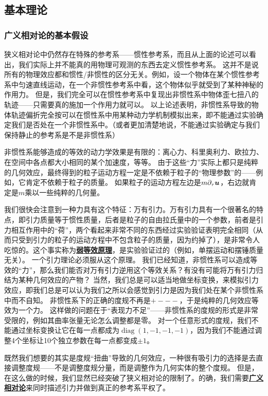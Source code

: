 \documentclass[hyperref, UTF8, a4paper]{ctexart}
\DeclareMathOperator{\diag}{diag}
\newcommand*{\concept}[1]{\underline{\textbf{#1}}}
\begin{document}
\subsection{基本理论}

\subsubsection{广义相对论的基本假设}

狭义相对论中仍然存在特殊的参考系——惯性参考系，而且从上面的论述可以看出，我们实际上并不能真的用物理可观测的东西去定义惯性参考系。
这并不是说所有的物理效应都和惯性/非惯性的区分无关。例如，设一个物体在某个惯性参考系中匀速直线运动，在一个非惯性参考系中看，这个物体似乎就受到了某种神秘的作用力。
但是，我们完全可以在惯性参考系中复现出非惯性系中物体歪七扭八的轨迹——只需要真的施加一个作用力就可以。
以上论述表明，非惯性系导致的物体轨迹偏折完全按可以在惯性系中用某种动力学机制模拟出来，即不能通过实验确定我们是否处在一个非惯性系中。（或者更加清楚地说，不能通过实验确定与我们保持静止的参考系是不是非惯性系）

非惯性系能够造成的等效的动力学效果是有限的：离心力、科里奥利力、欧拉力、在空间中各点都大小相同的某个加速度，等等。
由于这些“力”实际上都只是纯粹的几何效应，最终得到的粒子运动方程一定是不依赖于粒子的“物理参数”的——例如，它肯定不依赖于粒子的质量。
如果粒子的运动方程左边是$m \partial_\tau \vb*{u}$，右边就肯定是$m$乘以一些纯粹的几何量。

我们很快会注意到一种力具有这个特征：万有引力。万有引力具有一个很著名的特点，即引力质量等于惯性质量，后者是粒子的自由拉氏量中的一个参数，前者是引力相互作用中的“荷”，两个看起来非常不同的东西经过实验验证表明完全相同（从而只受到引力的粒子的运动方程中不包含粒子的质量，因为约掉了），是非常令人吃惊的。这个事实称为\concept{弱等效原理}，是实验验证过的（例如，单摆运动和摆锤质量无关）。
一个引力理论必须服从这个原理。
我们已经知道，非惯性系可以造成等效的“力”，那么我们能否对万有引力逆用这个等效关系？有没有可能将万有引力归结为某种几何效应的产物？
当然，我们总是可以适当地做坐标变换，来模拟引力效应，即我们总是可以认为我们之所以会感觉到引力是因为我们处在某个非惯性系中而不自知。
非惯性系下的正确的度规不再是$+---$，于是纯粹的几何效应等效为一个力。
这样做的问题在于“表现力不足”——非惯性系的度规的形式是非常受限的，例如其曲率张量无论怎么调整都是零。
对一个任意形式的度规，我们不能通过坐标变换让它在每一点都成为$\diag(1, -1, -1, -1)$，因为我们不能通过调整4个坐标让10个独立参数在每一点都变成$\pm 1$。

既然我们想要的其实是度规“扭曲”导致的几何效应，一种很有吸引力的选择是去直接调整度规——不是调整度规分量，而是调整作为几何实体的整个度规。
但是，在这么做的时候，我们显然已经突破了狭义相对论的限制了。的确，我们需要\concept{广义相对论}来同时描述引力并做到真正的参考系平权了。
\end{document}
